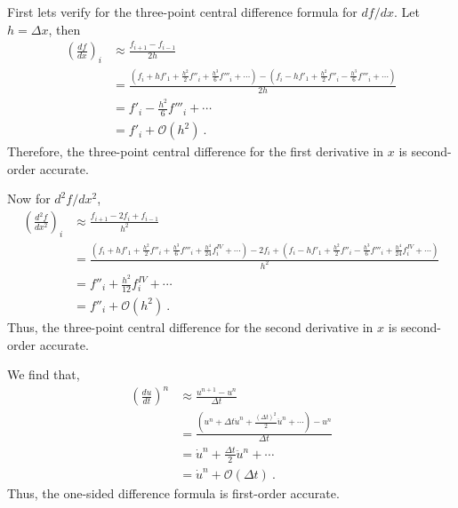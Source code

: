\begin{questions}


\begin{solution}

First lets verify for the three-point central difference formula for $df/dx$. Let $h = \Delta x$, then
\begin{align*}
\left(\frac{df}{dx}\right)_i &\approx \frac{f_{i+1}-f_{i-1}}{2h} \\
& = \frac{\left(f_i + hf'_1 + \frac{h^2}{2}f''_i + \frac{h^3}{6}f'''_i + \cdots  \right) - \left(f_i - hf'_1 + \frac{h^2}{2}f''_i - \frac{h^3}{6}f'''_i + \cdots  \right)}{2h} \\
& = f'_i -\frac{h^2}{6}f'''_i + \cdots \\
& = f'_i + \mathcal{O}(h^2) ~.
\end{align*}
Therefore, the three-point central difference for the first derivative in $x$ is second-order accurate.

Now for $d^2 f/dx^2$,
\begin{align*}
\left(\frac{d^2f}{dx^2}\right)_i &\approx \frac{f_{i+1} -2f_{i} + f_{i-1}}{h^2} \\
& = \frac{\left(f_i + hf'_1 + \frac{h^2}{2}f''_i + \frac{h^3}{6}f'''_i + \frac{h^4}{24}f^{IV}_i + \cdots  \right) -2f_i + \left(f_i - hf'_1 + \frac{h^2}{2}f''_i - \frac{h^3}{6}f'''_i + \frac{h^4}{24}f^{IV}_i + \cdots  \right)}{h^2} \\
& = f''_i + \frac{h^2}{12}f^{IV}_i + \cdots \\
& = f''_i + \mathcal{O}(h^2)~.
\end{align*}
Thus, the three-point central difference for the second derivative in $x$ is second-order accurate.

\end{solution}


\begin{solution}

We find that,
\begin{align*}
\left(\frac{du}{dt}\right)^n &\approx \frac{u^{n+1} - u^n}{\Delta t} \\
& = \frac{\left(u^n + \Delta t \dot{u}^n + \frac{(\Delta t)^2}{2}\ddot{u}^n + \cdots \right) - u^n}{\Delta t} \\
& = \dot{u}^n + \frac{\Delta t}{2}\ddot{u}^n + \cdots \\
& = \dot{u}^n + \mathcal{O}(\Delta t)~.
\end{align*}
Thus, the one-sided difference formula is first-order accurate.

\end{solution}

\end{questions}
